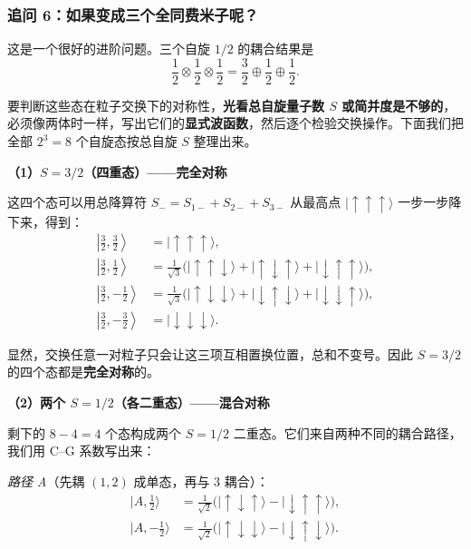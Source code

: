 \subsubsection*{追问 6：如果变成\textbf{三个}全同费米子呢？}

这是一个很好的进阶问题。三个自旋 $1/2$ 的耦合结果是
\[
\frac{1}{2} \otimes \frac{1}{2} \otimes \frac{1}{2} = \frac{3}{2} \oplus \frac{1}{2} \oplus \frac{1}{2}.
\]

要判断这些态在粒子交换下的对称性，\textbf{光看总自旋量子数 $S$ 或简并度是不够的}，必须像两体时一样，写出它们的\textbf{显式波函数}，然后逐个检验交换操作。下面我们把全部 $2^3=8$ 个自旋态按总自旋 $S$ 整理出来。

\textbf{（1）$S=3/2$（四重态）——完全对称}

这四个态可以用总降算符 $S_- = S_{1-}+S_{2-}+S_{3-}$ 从最高点 $|\!\uparrow\uparrow\uparrow\rangle$ 一步一步降下来，得到：
\begin{align}
\left|\tfrac{3}{2}, \tfrac{3}{2}\right\rangle &= |\uparrow\uparrow\uparrow\rangle, \\
\left|\tfrac{3}{2}, \tfrac{1}{2}\right\rangle &= \frac{1}{\sqrt{3}}\bigl(|\uparrow\uparrow\downarrow\rangle + |\uparrow\downarrow\uparrow\rangle + |\downarrow\uparrow\uparrow\rangle\bigr), \\
\left|\tfrac{3}{2}, -\tfrac{1}{2}\right\rangle &= \frac{1}{\sqrt{3}}\bigl(|\uparrow\downarrow\downarrow\rangle + |\downarrow\uparrow\downarrow\rangle + |\downarrow\downarrow\uparrow\rangle\bigr), \\
\left|\tfrac{3}{2}, -\tfrac{3}{2}\right\rangle &= |\downarrow\downarrow\downarrow\rangle.
\end{align}

显然，交换任意一对粒子只会让这三项互相置换位置，总和不变号。因此 $S=3/2$ 的四个态都是\textbf{完全对称}的。

\textbf{（2）两个 $S=1/2$（各二重态）——混合对称}

剩下的 $8-4=4$ 个态构成两个 $S=1/2$ 二重态。它们来自两种不同的耦合路径，我们用 C--G 系数写出来：

\textit{路径 A}（先耦 $(1,2)$ 成单态，再与 3 耦合）：
\begin{align}
|A,\tfrac{1}{2}\rangle &= \frac{1}{\sqrt{2}}\bigl(|\uparrow\downarrow\uparrow\rangle - |\downarrow\uparrow\uparrow\rangle\bigr), \\
|A,-\tfrac{1}{2}\rangle &= \frac{1}{\sqrt{2}}\bigl(|\uparrow\downarrow\downarrow\rangle - |\downarrow\uparrow\downarrow\rangle\bigr).
\end{align}

